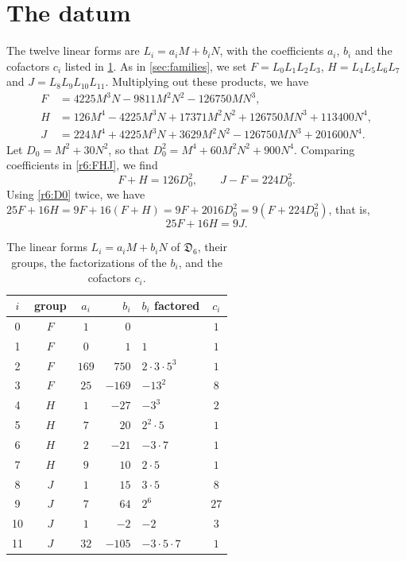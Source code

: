 \documentclass[12pt,oneside,openany]{book}
\theoremstyle{definition}
\theoremstyle{plain}
\numberwithin{equation}{chapter}
\theoremstyle{plain}
\theoremstyle{definition}
\theoremstyle{remark}
\newcommand{\datum}{\mathfrak D}
\begin{document}
\section{The datum}\label{sec:r6-datum}

The twelve linear forms are $L_i=a_iM+b_iN$, with the coefficients $a_i$, $b_i$ and the cofactors $c_i$ listed in \cref{tab:r6-forms}. As in \cref{sec:families}, we set $F=L_0L_1L_2L_3$, $H=L_4L_5L_6L_7$ and $J=L_8L_9L_{10}L_{11}$. Multiplying out these products, we have
\begin{equation}\label{r6:FHJ}
\begin{aligned}
F&=4225M^3N-9811M^2N^2-126750MN^3,\\
H&=126M^4-4225M^3N+17371M^2N^2+126750MN^3+113400N^4,\\
J&=224M^4+4225M^3N+3629M^2N^2-126750MN^3+201600N^4.
\end{aligned}
\end{equation}
Let $D_0=M^2+30N^2$, so that $D_0^2=M^4+60M^2N^2+900N^4$. Comparing coefficients in \eqref{r6:FHJ}, we find
\begin{equation}\label{r6:D0}
F+H=126D_0^2,\qquad J-F=224D_0^2.
\end{equation}
Using \eqref{r6:D0} twice, we have $25F+16H=9F+16(F+H)=9F+2016D_0^2=9(F+224D_0^2)$, that is,
\begin{equation}\label{r6:identity}
25F+16H=9J.
\end{equation}

\begin{table}[htbp]
\centering
\caption{The linear forms $L_i=a_iM+b_iN$ of $\datum_6$, their groups, the factorizations of the $b_i$, and the cofactors $c_i$.}
\label{tab:r6-forms}
\begin{tabular}{cccrlc}
\toprule
$i$ & group & $a_i$ & $b_i$ & $b_i$ factored & $c_i$\\
\midrule
0 & $F$ & $1$ & $0$ & & $1$ \\
1 & $F$ & $0$ & $1$ & $1$ & $1$ \\
2 & $F$ & $169$ & $750$ & $2\cdot3\cdot5^{3}$ & $1$ \\
3 & $F$ & $25$ & $-169$ & $-13^{2}$ & $8$ \\
4 & $H$ & $1$ & $-27$ & $-3^{3}$ & $2$ \\
5 & $H$ & $7$ & $20$ & $2^{2}\cdot5$ & $1$ \\
6 & $H$ & $2$ & $-21$ & $-3\cdot7$ & $1$ \\
7 & $H$ & $9$ & $10$ & $2\cdot5$ & $1$ \\
8 & $J$ & $1$ & $15$ & $3\cdot5$ & $8$ \\
9 & $J$ & $7$ & $64$ & $2^{6}$ & $27$ \\
10 & $J$ & $1$ & $-2$ & $-2$ & $3$ \\
11 & $J$ & $32$ & $-105$ & $-3\cdot5\cdot7$ & $1$ \\
\bottomrule
\end{tabular}
\end{table}
\end{document}
